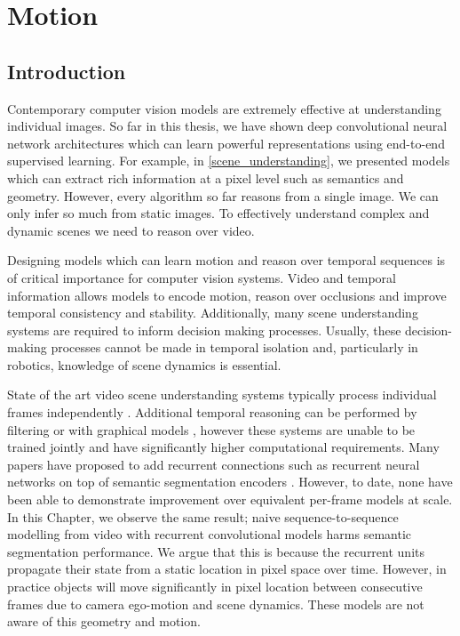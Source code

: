 \chapter{Motion}
\label{motion}

\graphicspath{{Chapter5/Figs/}}


\section{Introduction}

Contemporary computer vision models are extremely effective at understanding individual images. So far in this thesis, we have shown deep convolutional neural network architectures which can learn powerful representations using end-to-end supervised learning. For example, in \cref{scene_understanding}, we presented models which can extract rich information at a pixel level such as semantics and geometry.
However, every algorithm so far reasons from a single image. We can only infer so much from static images. To effectively understand complex and dynamic scenes we need to reason over video.

Designing models which can learn motion and reason over temporal sequences is of critical importance for computer vision systems. Video and temporal information allows models to encode motion, reason over occlusions and improve temporal consistency and stability. Additionally, many scene understanding systems are required to inform decision making processes. Usually, these decision-making processes cannot be made in temporal isolation and, particularly in robotics, knowledge of scene dynamics is essential.

State of the art video scene understanding systems typically process individual frames independently \citep{he2017maskrcnn,zhao2017pspnet,eigen2015predicting,zhou2017unsupervised,patraucean2015spatio,valipour2017recurrent,gadde2017semantic}. Additional temporal reasoning can be performed by filtering \citep{miksik2013efficient} or with graphical models \citep{de2012line,chen2011temporally,tripathi2015semantic,hur2016joint}, however these systems are unable to be trained jointly and have significantly higher computational requirements. Many papers have proposed to add recurrent connections such as recurrent neural networks \citep{hochreiter1997long} on top of semantic segmentation encoders \citep{patraucean2015spatio,valipour2017recurrent}. However, to date, none have been able to demonstrate improvement over equivalent per-frame models at scale. In this Chapter, we observe the same result; naive sequence-to-sequence modelling from video with recurrent convolutional models harms semantic segmentation performance. We argue that this is because the recurrent units propagate their state from a static location in pixel space over time. However, in practice objects will move significantly in pixel location between consecutive frames due to camera ego-motion and scene dynamics. These models are not aware of this geometry and motion.

